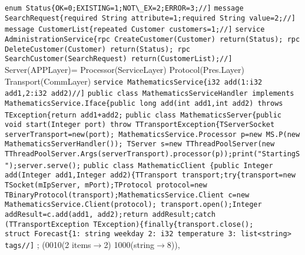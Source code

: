 \lstinline{enum Status{OK=0;EXISTING=1;NOT\_EX=2;ERROR=3;//]}
\lstinline{message SearchRequest{required String attribute=1;required String value=2;//]} 
\lstinline{message CustomerList{repeated Customer customers=1;//]}
\lstinline{service AdministrationService{rpc CreateCustomer(Customer) return(Status); rpc DeleteCustomer(Customer) return(Status); rpc SearchCustomer(SearchRequest) return(CustomerList);//]}
Server(APPLayer)=
Processor(ServiceLayer)
\bluetext{+}
Protocol(Pres.Layer)
\bluetext{+}
Transport(CommLayer)
\lstinline{service MathematicsService{i32 add(1:i32 add1,2:i32 add2)//]}
\lstinline{public class MathematicsServiceHandler implements MathematicsService.Iface{public long add(int add1,int add2) throws TException{return add1+add2;}
\lstinline{public class MathematicsServer{public void start(Integer port) throw TTransportException{TServerSocket serverTransport=new(port); MathematicsService.Processor p=new MS.P(new MathematicsServerHandler()); TServer s=new TThreadPoolServer(new TThreadPoolServer.Args(serverTransport).processor(p));print("StartingS");server.serve();}
\lstinline{public class MathematicClient {public Integer add(Integer add1,Integer add2){TTransport transport;try{transport=new TSocket(mIpServer, mPort);TProtocol protocol=new TBinaryProtocol(transport);MathematicsService.Client c=new MathematicsService.Client(protocol); transport.open();Integer addResult=c.add(add1, add2);return addResult;catch (TTransportException TException){finally{transport.close();}
%
%
%
\\
\btext{\hlgray{++:}}
\btext{\hlgray{--:}}
\lstinline{struct Forecast{1: string weekday 2: i32 temperature 3: list<string> tags//]}
;
(0010(2 items$\rightarrow$2) 1000(string$\rightarrow$8)), 
